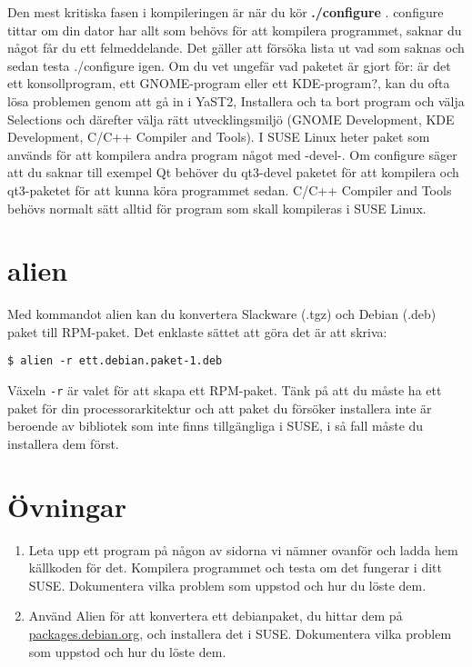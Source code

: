 \documentclass{article}
\begin{document}
Den mest kritiska fasen i kompileringen är när du kör \textbf{./configure} .
configure tittar om din dator har allt som behövs för att kompilera programmet,
saknar du något får du ett felmeddelande. Det gäller att försöka lista ut vad som
saknas och sedan testa ./configure igen. Om du vet ungefär vad paketet är gjort
för: är det ett konsollprogram, ett GNOME-program eller ett KDE-program?, kan du
ofta lösa problemen genom att gå in i YaST2, Installera och ta bort program och
välja Selections och därefter välja rätt utvecklingsmiljö (GNOME Development, KDE
Development, C/C++ Compiler and Tools). I SUSE Linux heter paket som används för
att kompilera andra program något med -devel-. Om configure säger att du saknar
till exempel Qt behöver du qt3-devel paketet för att kompilera och qt3-paketet
för att kunna köra programmet sedan. C/C++ Compiler and Tools behövs normalt sätt
alltid för program som skall kompileras i SUSE Linux.

\section*{alien}
Med kommandot alien kan du konvertera Slackware (.tgz) och Debian (.deb) paket
till RPM-paket. Det enklaste sättet att göra det är att skriva:
\begin{verbatim}
$ alien -r ett.debian.paket-1.deb
\end{verbatim}
Växeln \texttt{-r} är valet för att skapa ett RPM-paket. Tänk på att du måste ha
ett paket för din processorarkitektur och att paket du försöker installera inte är beroende
av bibliotek som inte finns tillgängliga i SUSE, i så fall måste du installera
dem först. 

\section*{Övningar}
\begin{enumerate}
\item[] Leta upp ett program på någon av sidorna vi nämner ovanför och ladda hem
källkoden för det. Kompilera programmet och testa om det fungerar i ditt SUSE.
Dokumentera vilka problem som uppstod och hur du löste dem.
\item[] Använd Alien för att konvertera ett debianpaket, du hittar dem på
\href{http://packages.debian.org/stable/}{packages.debian.org}, och installera
det i SUSE. Dokumentera vilka problem som uppstod och hur du löste dem.
\end{enumerate}
\end{document}
